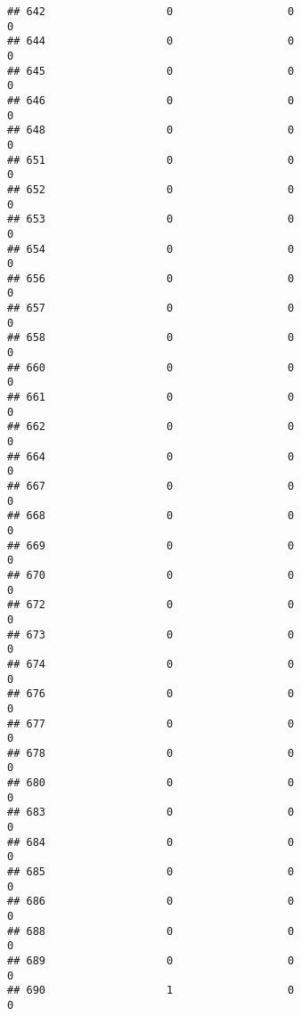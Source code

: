 \documentclass[
]{article}
\begin{document}
\begin{verbatim}
## 642                   0                  0                              0
## 644                   0                  0                              0
## 645                   0                  0                              0
## 646                   0                  0                              0
## 648                   0                  0                              0
## 651                   0                  0                              0
## 652                   0                  0                              0
## 653                   0                  0                              0
## 654                   0                  0                              0
## 656                   0                  0                              0
## 657                   0                  0                              0
## 658                   0                  0                              0
## 660                   0                  0                              0
## 661                   0                  0                              0
## 662                   0                  0                              0
## 664                   0                  0                              0
## 667                   0                  0                              0
## 668                   0                  0                              0
## 669                   0                  0                              0
## 670                   0                  0                              0
## 672                   0                  0                              0
## 673                   0                  0                              0
## 674                   0                  0                              0
## 676                   0                  0                              0
## 677                   0                  0                              0
## 678                   0                  0                              0
## 680                   0                  0                              0
## 683                   0                  0                              0
## 684                   0                  0                              0
## 685                   0                  0                              0
## 686                   0                  0                              0
## 688                   0                  0                              0
## 689                   0                  0                              0
## 690                   1                  0                              0

\end{verbatim}
\end{document}
